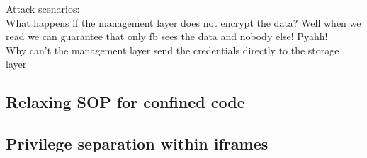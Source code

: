 Attack scenarios:
\\
What happens if the management layer does not encrypt the data?
Well when we read we can guarantee that only fb sees the data and
nobody else! Pyahh!
\\
Why can't the management layer send the credentials directly to the
storage layer




\subsection{Relaxing SOP for confined code}
\label{sec:system:mashup}

\subsection{Privilege separation within iframes}
\label{sec:system:script}
